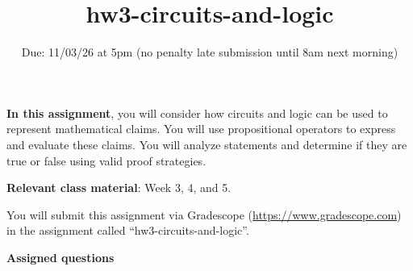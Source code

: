 

\title{hw3-circuits-and-logic}
\date{Due: 11/03/26 at 5pm (no penalty late submission until 8am next morning)}

\maketitle
\thispagestyle{fancy}

{\bf In this assignment}, you will consider how circuits and logic can be used to represent
mathematical claims. You will use propositional operators
to express and evaluate these claims.  You will analyze statements and determine if they are true or false using valid proof strategies.

{\bf Relevant class material}: Week 3, 4, and 5.

You will submit this assignment via Gradescope
(\href{https://www.gradescope.com}{https://www.gradescope.com}) 
in the assignment called ``hw3-circuits-and-logic''.

\instructions

{\bf Assigned questions}

